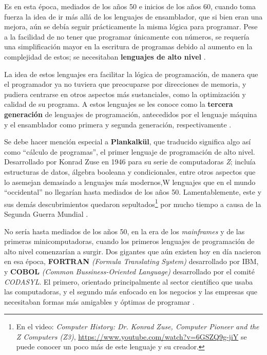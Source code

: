 \documentclass[letterpaper,12pt,oneside]{book}
\begin{document}
		Es en esta época, mediados de los años 50 e inicios de los años 60, cuando toma fuerza la idea
		de ir más allá de los lenguajes de ensamblador, que si bien eran una mejora, aún se debía seguir prácticamente la misma lógica para programar. Pese a
		la facilidad de no tener que programar únicamente con números, se requería una simplificación mayor en la escritura
		de programas debido al aumento en la complejidad de estos; se necesitaban \textbf{lenguajes de alto nivel}
		\cite{oregan_brief_2012}.
  
        La idea
		de estos lenguajes era facilitar la lógica de programación, de manera que el programador ya no tuviera que preocuparse por direcciones de memoria, y pudiera centrarse
		en otros aspectos más sustanciales, como la optimización y calidad de su programa. A estos lenguajes se les conoce como la \textbf{tercera generación}
		de lenguajes de programación, antecedidos por el lenguaje máquina y el ensamblador como primera y segunda generación, respectivamente \cite{oregan_brief_2012}.
		
		Se debe hacer mención especial a \textbf{Plankalk\"{u}l}, que traducido significa algo así como ``cálculo de programas'', el primer lenguaje de programación de alto 
		nivel. Desarrollado por Konrad Zuse en 1946 para su serie
		de computadoras \textit{Z}; incluía estructuras de datos, álgebra booleana y condicionales, entre otros aspectos que lo asemejan demasiado a lenguajes más modernos,W
		lenguajes que en el mundo ``occidental'' no llegarían hasta mediados de los años 50. Lamentablemente, este y sus demás descubrimientos quedaron sepultados\footnote{En el video: \emph{Computer History: Dr. Konrad Zuse, Computer Pioneer and the Z 
		Computers (Z3)}, \url{https://www.youtube.com/watch?v=6GSZQ9g-jiY} se puede conocer un poco más de este lenguaje y su creador.} por mucho 
		tiempo a causa de la Segunda Guerra Mundial \cite{oregan_brief_2012}.
		
		No sería hasta mediados de los años 50, en la era de los \textit{mainframes} y de las primeras minicomputadoras, cuando los primeros lenguajes de programación
		de alto nivel comenzarían a surgir. Dos gigantes que aún existen hoy en día nacieron en esa época, \textbf{FORTRAN} \textit{(Formula Translating 
		System)} desarrollado por IBM, y
		\textbf{COBOL} \textit{(Common Bussiness-Oriented Language)} desarrollado por el comité \textit{CODASYL}. El primero, orientado principalmente al sector científico que usaba
		las computadoras, y el segundo más enfocado en los negocios y las empresas que necesitaban formas más amigables y óptimas de programar \cite{oregan_brief_2012}.
\end{document}
